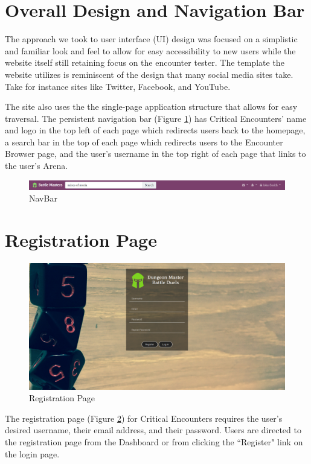 \documentclass[12pt,a4paper]{report}
\begin{document}
	\section{Overall Design and Navigation Bar}
	The approach we took to user interface (UI) design was focused on a simplistic and familiar look and feel to allow for easy accessibility to new users while the website itself still retaining focus on the encounter tester. The template the website utilizes is reminiscent of the design that many social media sites take. Take for instance sites like Twitter, Facebook, and YouTube.\par
	The site also uses the the single-page application structure that allows for easy traversal. The persistent navigation bar (Figure \ref{fig: NavBar}) has Critical Encounters' name and logo in the top left of each page which redirects users back to the homepage, a search bar in the top of each page which redirects users to the Encounter Browser page, and the user's username in the top right of each page that links to the user's Arena.
	\bigskip
	\bigskip
	\begin{figure}[H]
		\centering
		\centerline{\includegraphics[scale=.30]{navbar}}
		\caption{NavBar}
		\label{fig: NavBar}
	\end{figure}
	\section{Registration Page}
	\begin{figure}[H]
		\centering
		\includegraphics[scale=.20]{register}
		\caption{Registration Page}
		\label{fig: Registration Page}
	\end{figure}
	The registration page (Figure \ref{fig: Registration Page})  for Critical Encounters requires the user's desired username, their email address, and their password. Users are directed to the registration page from the Dashboard or from clicking the ``Register" link on the login page.
	\newpage
\end{document}
